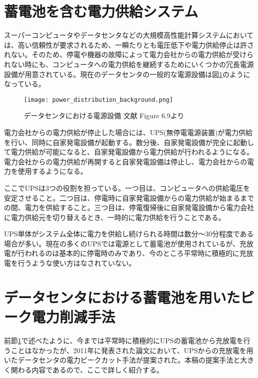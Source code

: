 \section{蓄電池を含む電力供給システム}
\label{sec:ups}

スーパーコンピュータやデータセンタなどの大規模高性能計算システムにおいては、高い信頼性が要求されるため、一瞬たりとも電圧低下や電力供給停止は許されない。そのため、停電や機器の故障によって電力会社からの電力供給が受けられない時にも、コンピュータへの電力供給を継続するためにいくつかの冗長電源設備が用意されている。現在のデータセンタの一般的な電源設備は図\ref{fig:power_distribution_background}のようになっている。
\begin{figure}[t]
 \begin{center}
  \texttt{[image: power\_distribution\_background.png]}
 \end{center}
 \caption{データセンタにおける電源設備 文献\cite{Hennessy:2011:CAF:1999263} Figure 6.9より}
 \label{fig:power_distribution_background}
\end{figure}

電力会社からの電力供給が停止した場合には、UPS(無停電電源装置)が電力供給を行い、同時に自家発電設備が起動する。数分後、自家発電設備が完全に起動して電力供給が可能になると、自家発電設備から電力供給が行われるようになる。電力会社からの電力供給が再開すると自家発電設備は停止し、電力会社からの電力を使用するようになる。

ここでUPSは3つの役割を担っている。一つ目は、コンピュータへの供給電圧を安定させること。二つ目は、停電時に自家発電設備からの電力供給が始まるまでの間、電力を供給すること。三つ目は、停電復帰後に自家発電設備から電力会社に電力供給元を切り替えるとき、一時的に電力供給を行うことである。

UPS単体がシステム全体に電力を供給し続けられる時間は数分〜30分程度である場合が多い。現在の多くのUPSでは電源として蓄電池が使用されているが、充放電が行われるのは基本的に停電時のみであり、今のところ平常時に積極的に充放電を行うような使い方はなされていない。


\section{データセンタにおける蓄電池を用いたピーク電力削減手法}
\label{sec:capping}

前節\ref{sec:ups}で述べたように、今までは平常時に積極的にUPSの蓄電池から充放電を行うことはなかったが、2011年に発表された論文\cite{Govindan:2011:BLT:2024723.2000105}において、UPSからの充放電を用いたデータセンタの電力ピークカット手法が提案された。本稿の提案手法と大きく関わる内容であるので、ここで詳しく紹介する。

